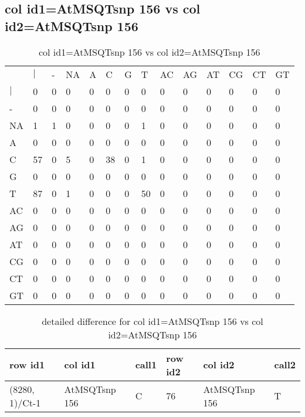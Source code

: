 \subsection{col id1=AtMSQTsnp 156 vs col id2=AtMSQTsnp 156}
\begin{center}
\begin{longtable}{|l|l|l|l|l|l|l|l|l|l|l|l|l|l|}
\caption{col id1=AtMSQTsnp 156 vs col id2=AtMSQTsnp 156} \label{table_dm534}\\
\hline
\\
\hline
&$|$&-&NA&A&C&G&T&AC&AG&AT&CG&CT&GT\\
$|$&0&0&0&0&0&0&0&0&0&0&0&0&0\\
-&0&0&0&0&0&0&0&0&0&0&0&0&0\\
NA&1&1&0&0&0&0&1&0&0&0&0&0&0\\
A&0&0&0&0&0&0&0&0&0&0&0&0&0\\
C&57&0&5&0&38&0&1&0&0&0&0&0&0\\
G&0&0&0&0&0&0&0&0&0&0&0&0&0\\
T&87&0&1&0&0&0&50&0&0&0&0&0&0\\
AC&0&0&0&0&0&0&0&0&0&0&0&0&0\\
AG&0&0&0&0&0&0&0&0&0&0&0&0&0\\
AT&0&0&0&0&0&0&0&0&0&0&0&0&0\\
CG&0&0&0&0&0&0&0&0&0&0&0&0&0\\
CT&0&0&0&0&0&0&0&0&0&0&0&0&0\\
GT&0&0&0&0&0&0&0&0&0&0&0&0&0\\
\hline
\end{longtable}
\end{center}

\begin{center}
\begin{longtable}{|l|l|l|l|l|l|}
\caption{detailed difference for col id1=AtMSQTsnp 156 vs col id2=AtMSQTsnp 156} \label{table_dm535}\\
\hline
row id1&col id1&call1&row id2&col id2&call2\\
\hline
(8280, 1)/Ct-1&AtMSQTsnp 156&C&76&AtMSQTsnp 156&T\\
\hline
\end{longtable}
\end{center}

